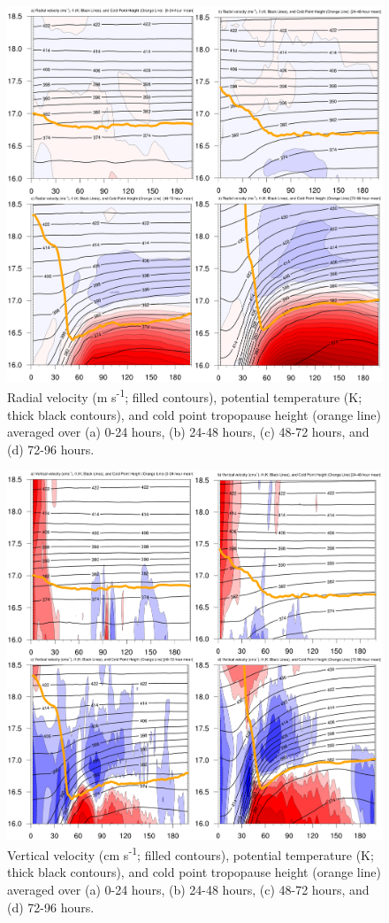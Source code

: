 \documentclass{ametsoc}
\begin{document}
\begin{figure}[ht]
\centerline{\includegraphics[width=39pc]{figures/fig09_u.png}}
\caption{Radial velocity (m s\textsuperscript{-1}; filled contours), potential temperature (K; thick black contours), and cold point tropopause height (orange line) averaged over (a) 0-24 hours, (b) 24-48 hours, (c) 48-72 hours, and (d) 72-96 hours.}
\label{fig:u}
\end{figure}

\begin{figure}[ht]
\centerline{\includegraphics[width=39pc]{figures/fig10_w.png}}
\caption{Vertical velocity (cm s\textsuperscript{-1}; filled contours), potential temperature (K; thick black contours), and cold point tropopause height (orange line) averaged over (a) 0-24 hours, (b) 24-48 hours, (c) 48-72 hours, and (d) 72-96 hours.}
\label{fig:w}
\end{figure}
\end{document}
